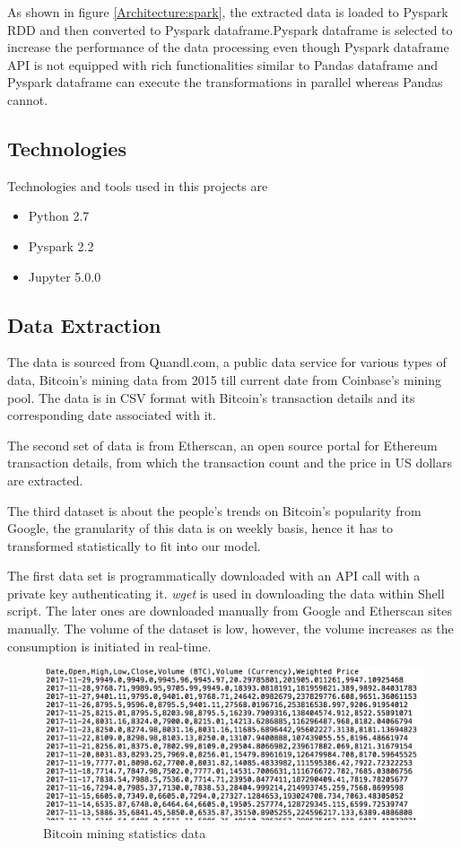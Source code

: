 \documentclass[sigconf]{acmart}
\begin{document}
As shown in figure \ref{Architecture:spark}, the extracted data is loaded to Pyspark RDD and then converted to Pyspark dataframe.Pyspark dataframe is selected to increase the performance of the data processing even though Pyspark dataframe API is not equipped with rich functionalities  similar to Pandas dataframe and Pyspark dataframe can execute the transformations in parallel whereas Pandas cannot. 

\subsection{Technologies}
Technologies and tools used in this projects are
\begin{itemize}
\item Python 2.7 
\item Pyspark 2.2
\item Jupyter 5.0.0
\end{itemize}


\subsection{Data Extraction}
The data is sourced from Quandl.com, a public data service for various types of data, Bitcoin's mining data from 2015 till current date from Coinbase's mining pool. The data is in CSV format with Bitcoin's transaction details and its corresponding date associated with it.

The second set of data is from Etherscan, an open source portal for Ethereum transaction details, from which the transaction count and the price in US dollars are extracted.

The third dataset is about the people's trends on Bitcoin's popularity from Google, the granularity of this data is on weekly basis, hence it has to transformed statistically to fit into our model.

The first data set is programmatically downloaded with an API call with a private key authenticating it. {\em wget } is used in downloading the data within Shell script.
The later ones are downloaded manually from Google and Etherscan sites manually. The volume of the dataset is low, however, the volume increases as the consumption is initiated in real-time.

\begin{figure}[!ht]
  \centering\includegraphics[width=\columnwidth]{images/Source1data.png}
  \caption{Bitcoin mining statistics data}
  \label{}
\end{figure}
\end{document}
